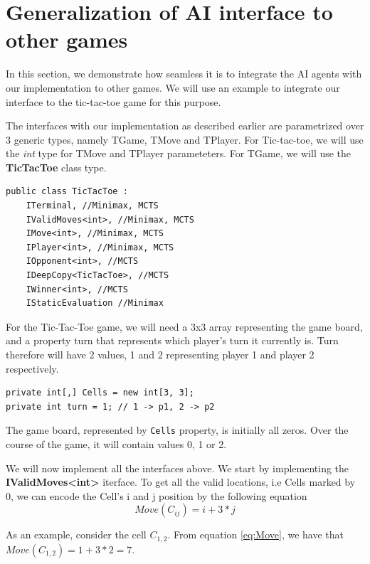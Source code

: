 \section{Generalization of AI interface to other games}
\label{TicTacToe}

In this section, we demonstrate how seamless it is to integrate the \gls{AI} agents with our implementation to other games. We will use an example to integrate our interface to the tic-tac-toe game for this purpose.

The interfaces with our implementation as described earlier  are parametrized over 3 generic types, namely TGame, TMove and TPlayer. For Tic-tac-toe, we will use the \textit{int} type for TMove and TPlayer parameteters. For TGame, we will use the \textbf{TicTacToe} class type.

\begin{lstlisting}
public class TicTacToe :
    ITerminal, //Minimax, MCTS
    IValidMoves<int>, //Minimax, MCTS
    IMove<int>, //Minimax, MCTS
    IPlayer<int>, //Minimax, MCTS
    IOpponent<int>, //MCTS
    IDeepCopy<TicTacToe>, //MCTS
    IWinner<int>, //MCTS
    IStaticEvaluation //Minimax
\end{lstlisting}

For the Tic-Tac-Toe game, we will need a 3x3 array representing the game board, and a property turn that represents which player's turn it currently is. Turn therefore will have 2 values, 1 and 2 representing player 1 and player 2 respectively.

\begin{lstlisting}
private int[,] Cells = new int[3, 3];
private int turn = 1; // 1 -> p1, 2 -> p2
\end{lstlisting}

The game board, represented by \texttt{Cells} property, is initially all zeros. Over the course of the game, it will contain values 0, 1 or 2.

We will now implement all the interfaces above. We start by implementing the \textbf{IValidMoves\textless{}int\textgreater{}} iterface. To get all the valid locations, i.e Cells marked by 0, we can encode the Cell's i and j position by the following equation
\begin{equation}
\label{eq:Move}
    Move(C_{ij}) = i + 3 * j
\end{equation}

As an example, consider the cell $C_{1,2}$. From equation \ref{eq:Move}, we have that $Move(C_{1,2}) = 1 + 3 * 2 = 7$.


